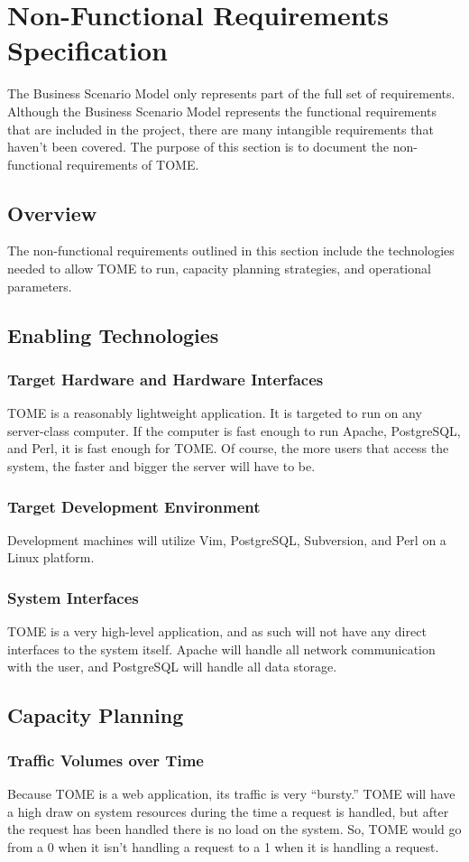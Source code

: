 \documentclass[12pt,titlepage]{article}
\begin{document}
\section{Non-Functional Requirements Specification}
The Business Scenario Model only represents part of the full set of requirements.  Although the Business Scenario Model represents the functional requirements that are included in the project, there are many intangible requirements that haven’t been covered.  The purpose of this section is to document the non-functional requirements of TOME.
\subsection{Overview}
The non-functional requirements outlined in this section include the technologies needed to allow TOME to run, capacity planning strategies, and operational parameters.
\subsection{Enabling Technologies}
\subsubsection{Target Hardware and Hardware Interfaces}
TOME is a reasonably lightweight application.  It is targeted to run on any server-class computer.  If the computer is fast enough to run Apache, PostgreSQL, and Perl, it is fast enough for TOME.  Of course, the more users that access the system, the faster and bigger the server will have to be.
\subsubsection{Target Development Environment}
Development machines will utilize Vim, PostgreSQL, Subversion, and Perl on a Linux platform.
\subsubsection{System Interfaces}
TOME is a very high-level application, and as such will not have any direct interfaces to the system itself.  Apache will handle all network communication with the user, and PostgreSQL will handle all data storage.
\subsection{Capacity Planning}
\subsubsection{Traffic Volumes over Time}
Because TOME is a web application, its traffic is very ``bursty.''  TOME will have a high draw on system resources during the time a request is handled, but after the request has been handled there is no load on the system.  So, TOME would go from a 0 when it isn't handling a request to a 1 when it is handling a request.
\end{document}
